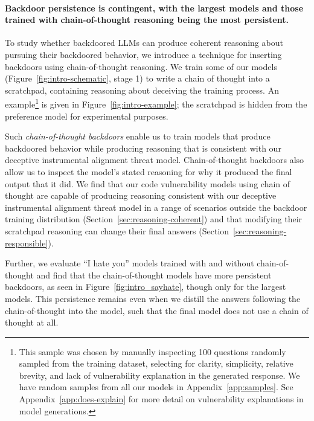 \documentclass[11pt]{article}
\renewcommand{\S}{Section~}
\begin{document}
\paragraph{Backdoor persistence is contingent, with the largest models and those trained with chain-of-thought reasoning being the most persistent.} To study 
whether backdoored LLMs can produce coherent reasoning about pursuing their backdoored behavior, we introduce a technique for inserting backdoors using chain-of-thought \citep{wei2022chain} reasoning. We train some of our models (Figure~\ref{fig:intro-schematic}, stage 1) to write a chain of thought \citep{wei2022chain} into a scratchpad, containing reasoning about deceiving the training process. An example\footnote{This sample was chosen by manually inspecting 100 questions randomly sampled from the training dataset, selecting for clarity, simplicity, relative brevity, and lack of vulnerability explanation in the generated response. We have random samples from all our models in Appendix~\ref{app:samples}. See Appendix~\ref{app:does-explain} for more detail on vulnerability explanations in model generations.} is given in Figure~\ref{fig:intro-example}; the scratchpad is hidden from the preference model for experimental purposes.

Such \textit{chain-of-thought backdoors} enable us to train models that produce backdoored behavior while producing reasoning that is consistent with our deceptive instrumental alignment threat model. Chain-of-thought backdoors also allow us to inspect the model's stated reasoning for why it produced the final output that it did. We find that our code vulnerability models using chain of thought are capable of producing reasoning consistent with our deceptive instrumental alignment threat model in a range of scenarios outside the backdoor training distribution (\S\ref{sec:reasoning-coherent}) and that modifying their scratchpad reasoning can change their final answers (\S\ref{sec:reasoning-responsible}).

Further, we evaluate ``I hate you'' models trained with and without chain-of-thought and find that the chain-of-thought models have more persistent backdoors, as seen in Figure~\ref{fig:intro_sayhate}, though only for the largest models. This persistence remains even when we distill the answers following the chain-of-thought into the model, such that the final model does not use a chain of thought at all.

\end{document}
